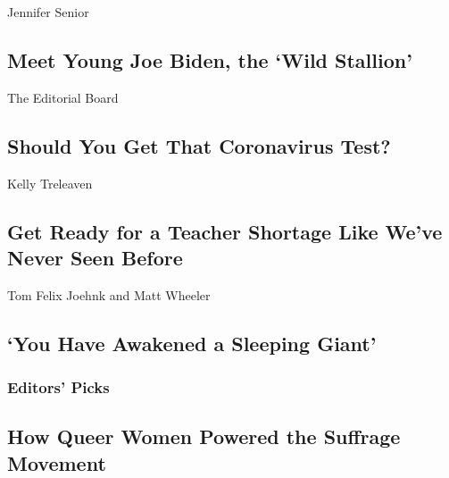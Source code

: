 \href{/2020/08/15/opinion/joe-biden-2020-1988-what-it-takes.html}{}

Jennifer Senior

\hypertarget{meet-young-joe-biden-the-wild-stallion}{%
\subsection{Meet Young Joe Biden, the `Wild
Stallion'}\label{meet-young-joe-biden-the-wild-stallion}}

\href{/2020/08/16/opinion/us-coronavirus-testing.html}{}

The Editorial Board

\hypertarget{should-you-get-that-coronavirus-test}{%
\subsection{Should You Get That Coronavirus
Test?}\label{should-you-get-that-coronavirus-test}}

\href{/2020/08/17/opinion/coronavirus-schools-teachers.html}{}

Kelly Treleaven

\hypertarget{get-ready-for-a-teacher-shortage-like-weve-never-seen-before}{%
\subsection{Get Ready for a Teacher Shortage Like We've Never Seen
Before}\label{get-ready-for-a-teacher-shortage-like-weve-never-seen-before}}

\href{/2020/08/17/opinion/thailand-protests.html}{}

Tom Felix Joehnk and Matt Wheeler

\hypertarget{you-have-awakened-a-sleeping-giant}{%
\subsection{`You Have Awakened a Sleeping
Giant'}\label{you-have-awakened-a-sleeping-giant}}

\hypertarget{editors-picks}{%
\subsubsection{Editors' Picks}\label{editors-picks}}

\href{/2020/08/14/us/queer-lesbian-women-suffrage.html}{}

\hypertarget{how-queer-women-powered-the-suffrage-movement}{%
\subsection{How Queer Women Powered the Suffrage
Movement}\label{how-queer-women-powered-the-suffrage-movement}}

